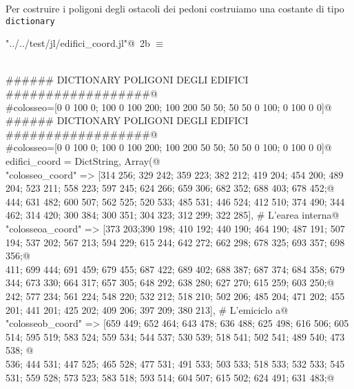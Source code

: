 \documentclass[]{article}
\begin{document}
Per costruire i poligoni degli ostacoli dei pedoni costruiamo una costante di tipo  {\tt dictionary} 
\begin{flushleft} \small
\begin{minipage}{\linewidth} \label{scrap3}
\protect{}\verb@"../../test/jl/edifici_coord.jl"@\nobreak\ {\footnotesize 2b }$\equiv$
\vspace{-1ex}
\begin{list}{}{} \item
\mbox{}\verb@@\\
\mbox{}\verb@###### DICTIONARY POLIGONI DEGLI EDIFICI ##################@\\
\mbox{}\verb@#colosseo=[0 0 100 0; 100 0 100 200; 100 200 50 50; 50 50 0 100; 0 100 0 0]@\\
\mbox{}\verb@###### DICTIONARY POLIGONI DEGLI EDIFICI ##################@\\
\mbox{}\verb@#colosseo=[0 0 100 0; 100 0 100 200; 100 200 50 50; 50 50 0 100; 0 100 0 0]@\\
\mbox{}\verb@const edifici_coord = Dict{String, Array}(@\\
\mbox{}\verb@"colosseo_coord" => [314 256; 329 242; 359 223; 382 212; 419 204; 454 200; 489 204; 523 211; 558 223; 597 245; 624 266; 659 306; 682 352; 688 403; 678 452;@\\
\mbox{} 444; 631 482; 600 507; 562 525; 520 533; 485 531; 446 524; 412 510; 374 490; 344 462; 314 420; 300 384; 300 351; 304 323; 312 299; 322 285], # L'earea interna@\\
\mbox{}\verb@"colosseoa_coord" => [373 203;390 198; 410 192; 440 190; 464 190; 487 191; 507 194; 537 202; 567 213; 594 229; 615 244; 642 272; 662 298; 678 325; 693 357; 698 356;@\\
\mbox{} 411; 699 444; 691 459; 679 455; 687 422; 689 402; 688 387; 687 374; 684 358; 679 344; 673 330; 664 317; 657 305; 648 292; 638 280; 627 270; 615 259; 603 250;@\\
\mbox{} 242; 577 234; 561 224; 548 220; 532 212; 518 210; 502 206; 485 204; 471 202; 455 201; 441 201; 425 202; 409 206; 397 209; 380 213], # L'emiciclo a@\\
\mbox{}\verb@"colosseob_coord" => [659 449; 652 464; 643 478; 636 488; 625 498; 616 506; 605 514; 595 519; 583 524; 559 534; 544 537; 530 539; 518 541; 502 541; 489 540; 473 538; @\\
\mbox{} 536; 444 531; 447 525; 465 528; 477 531; 491 533; 503 533; 518 533; 532 533; 545 531; 559 528; 573 523; 583 518; 593 514; 604 507; 615 502; 624 491; 631 483;@\\

\end{list}
\end{minipage}
\end{flushleft}
\end{document}
